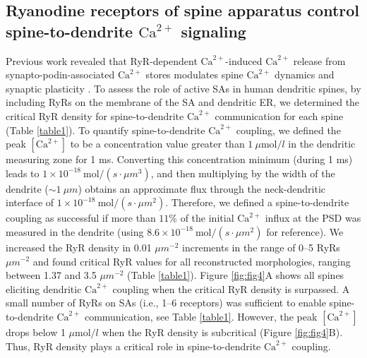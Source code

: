 \documentclass[12pt]{article}
\begin{document}
\subsection*{Ryanodine receptors of spine apparatus control spine-to-dendrite $\textrm{Ca}^{2+}$ signaling}
Previous work revealed that RyR-dependent $\textrm{Ca}^{2+}$-induced $\textrm{Ca}^{2+}$ release from synapto-podin-associated $\textrm{Ca}^{2+}$ stores modulates spine $\textrm{Ca}^{2+}$ dynamics and synaptic plasticity \cite{Vlachos2009,Korkotian2014,Maggio2014}. To assess the role of active SAs in human dendritic spines, by including RyRs on the membrane of the SA and dendritic ER, we determined the critical RyR density for spine-to-dendrite $\textrm{Ca}^{2+}$ communication for each spine (Table \ref{table1}). To quantify spine-to-dendrite $\textrm{Ca}^{2+}$ coupling, we defined the peak $[\textrm{Ca}^{2+}]$ to be a concentration value greater than $1\  \mu \textrm{mol}/l$ in the dendritic measuring zone for 1 ms. Converting this concentration minimum (during 1 ms) leads to $1\times 10^{-18}\ \textrm{mol}/(s\cdot\mu m^3)$, and then multiplying by the width of the dendrite ($\sim 1\ \mu m$) obtains an approximate flux through the neck-dendritic interface of $1\times 10^{-18}\ \textrm{mol}/(s\cdot \mu m^2)$. Therefore, we defined a spine-to-dendrite coupling as successful if more than $11\%$ of the initial $\textrm{Ca}^{2+}$ influx at the PSD was measured in the dendrite (using $8.6\times 10^{-18}\ \textrm{mol}/(s\cdot \mu m^2)$ for reference). We increased the RyR density in 0.01 $\mu m^{-2}$ increments in the range of 0–5 RyRs $\mu m^{-2}$ and found critical RyR values for all reconstructed morphologies, ranging between 1.37 and 3.5 $\mu m^{-2}$ (Table \ref{table1}). Figure \ref{fig:fig4}A shows all spines eliciting dendritic $\textrm{Ca}^{2+}$ coupling when the critical RyR density is surpassed. A small number of RyRs on SAs (i.e., 1–6 receptors) was sufficient to enable spine-to-dendrite $\textrm{Ca}^{2+}$ communication, see Table \ref{table1}. However, the peak $[\textrm{Ca}^{2+}]$ drops below 1 $\mu\textrm{mol}/l$ when the RyR density is subcritical (Figure \ref{fig:fig4}B). Thus, RyR density plays a critical role in spine-to-dendrite $\textrm{Ca}^{2+}$ coupling.
\end{document}

